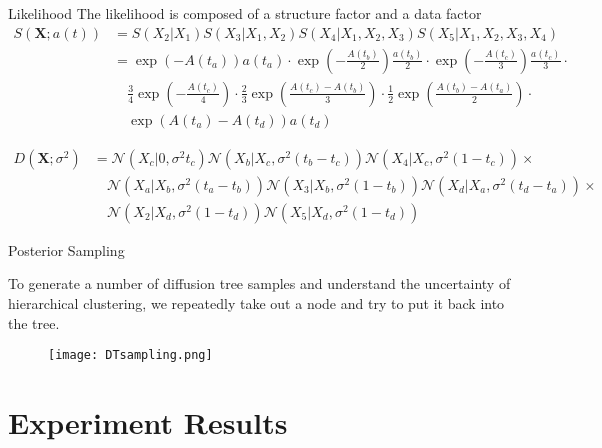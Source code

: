 \documentclass{beamer}
\begin{document}
	\begin{frame}{Likelihood}
		The likelihood is composed of a structure factor and a data factor
		\small
		\begin{align*}
    S(\bm{X}; a(t)) &= S\left(\left.X_2 \right\vert X_1  \right) S\left(\left.X_3 \right\vert X_1, X_2  \right)S\left(\left.X_4 \right\vert X_1, X_2, X_3  \right)S\left(\left.X_5 \right\vert X_1, X_2, X_3, X_4  \right)\\
    &=\exp(-A(t_a))a(t_a) \cdot \exp(-\frac{A(t_b)}{2})\frac{a(t_b)}{2} \cdot  \exp(-\frac{A(t_c)}{3})\frac{a(t_c)}{3}\cdot \\
    &\quad \frac{3}{4}\exp(-\frac{A(t_c)}{4})\cdot \frac{2}{3}\exp(\frac{A(t_c) - A(t_b)}{3})\cdot \frac{1}{2}\exp(\frac{A(t_b) - A(t_a)}{2})\cdot \\
    &\quad \exp(A(t_a) - A(t_d))a(t_d)
\end{align*}

\begin{align*}
    D(\bm{X}; \sigma^2) &= \mathcal{N}\left(\left. X_c \right\vert 0, \sigma^2 t_c \right)\mathcal{N}\left(\left. X_b \right\vert X_c, \sigma^2 (t_b - t_c) \right)\mathcal{N}\left(\left. X_4 \right\vert X_c, \sigma^2 (1 - t_c) \right)\times \\
    &\quad \mathcal{N}\left(\left. X_a \right\vert 
    X_b, \sigma^2 (t_a - t_b) \right) \mathcal{N}\left(\left. X_3 \right\vert X_b, \sigma^2 (1 - t_b) \right)\mathcal{N}\left(\left. X_d \right\vert X_a, \sigma^2 (t_d - t_a) \right)\times \\
    &\quad \mathcal{N}\left(\left. X_2 \right\vert X_d, \sigma^2 (1 - t_d) \right) \mathcal{N}\left(\left. X_5 \right\vert X_d, \sigma^2 (1 - t_d) \right)
\end{align*}


	\end{frame}	
	
	\begin{frame}{Posterior Sampling}
	
		To generate a number of diffusion tree samples and understand the uncertainty of hierarchical clustering, we repeatedly take out a node and try to put it back into the tree.
		
		\begin{figure}[htbp]
			\centering
			\texttt{[image: DTsampling.png]}
		\end{figure}
	\end{frame}	
	
	\section{Experiment Results}
	
\end{document}

